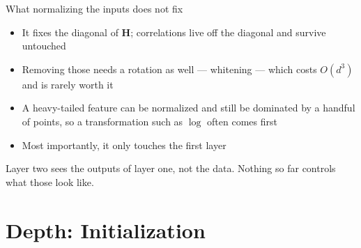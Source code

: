 \documentclass[aspectratio=169, 11pt]{beamer}
\newcommand{\nosrc}{}       %
\begin{document}
\begin{frame}{What normalizing the inputs does not fix}
  \nosrc
  \vspace{0.2em}
  \begin{itemize}\itemsep0.35em
    \item It fixes the \alert{diagonal} of $\mathbf{H}$; correlations live off
          the diagonal and survive untouched
    \item Removing those needs a rotation as well --- whitening ---
          which costs $O(d^3)$ and is rarely worth it
    \item A heavy-tailed feature can be normalized and still be
          dominated by a handful of points, so a transformation such as
          $\log$ often comes first
    \item Most importantly, it only touches the \alert{first} layer
  \end{itemize}
  \begin{redhighlight}
    Layer two sees the outputs of layer one, not the data. Nothing so
    far controls what those look like.
  \end{redhighlight}
\end{frame}

\section{Depth: Initialization}
\end{document}
